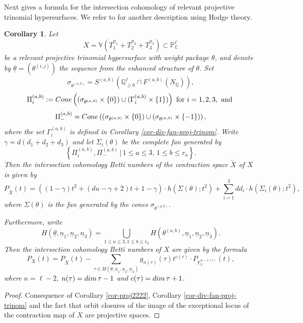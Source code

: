 \documentclass[11pt, reqno]{amsart}
\theoremstyle{plain}
\newtheorem{corollary}[theorem]{Corollary}
\theoremstyle{definition}
\theoremstyle{remark}
\begin{document}
Next gives a formula for the intersection cohomology of relevant projective trinomial hypersurfaces.  We refer 
to \cite{BC94, BB96} for another description using Hodge theory. 
\begin{corollary}
Let 
$$X  =  \mathbb{V}(T_{1}^{\underline{n}_{1}} + T_{2}^{\underline{n}_{2}}  + T_{3}^{\underline{n}_{3}})\subset \mathbb{P}_{\mathbb{C}}^{\ell}$$
be a relevant projective trinomial hypersurface with weight package $\theta$, and denote by $\underline{\theta} =  (\theta^{(i,j)})$ the sequence from the enhanced structure of $\theta$. Set $$\sigma_{\theta^{(a, b)}} =  S^{(a,b)}(\mathbb{Q}_{\geq 0}^{\ell}\cap F^{(a, b)}(N_{\mathbb{Q}})),$$
$$\Pi_{i}^{(a, b)} := {\rm Cone}\left((\sigma_{\theta^{(a, b)}}\times\{0\})\cup (\Gamma_{i}^{(a, b)}\times\{1\})\right)\text{ for }i =1,2,3,
\text{ and }$$
$$\Pi_{-}^{(a, b)}  =  {\rm Cone}\left((\sigma_{\theta^{(a, b)}}\times\{0\})\cup (\sigma_{\theta^{(a, b)}}\times\{-1\})\right),$$
 where the set $\Gamma_{i}^{(a, b)}$ is defined in Corollary \ref{cor-div-fan-proj-trinom}. Write $\gamma =  d(d_{1} + d_{2} + d_{3})$ and let $\Sigma_{i}(\theta)$ be the complete
fan generated by 
$$\left\{\Pi_{i}^{(a, b)}, \Pi_{-}^{(a, b)}\,|\, 1\leq a\leq 3,\, 1\leq b\leq r_{a}\right\}.$$
Then the intersection cohomology Betti numbers of the contraction space $\widetilde{X}$ of $X$ is given by
$$P_{\widetilde{X}}(t) =  \left((1-\gamma)t^{2} + (du - \gamma + 2)t  + 1- \gamma \right)\cdot h(\Sigma(\theta); t^{2}) +  \sum_{i = 1}^{3} dd_{i}\cdot h(\Sigma_{i}(\theta); t^{2}),$$
where $\Sigma(\theta)$ is the fan generated by the cones $\sigma_{\theta^{(a,b)}}$. 

Furthermore, write
$$H(\underline{\theta}, \underline{n}_{1}, \underline{n}_{2}, \underline{n}_{3})  =  \bigcup_{1\leq a \leq 3, 1\leq b \leq r_{a}}
H(\theta^{(a, b)}, \underline{n}_{1}, \underline{n}_{2}, \underline{n}_{3}).$$
Then the intersection cohomology Betti numbers of $X$ are given by the formula 
$$P_{X}(t)  = P_{\widetilde{X}}(t)  -  \sum_{\tau \in H(\underline{\theta}, \underline{n}_{1},\underline{n}_{2},\underline{n}_{3})} g_{n(\tau)}(\tau) t^{c(\tau)} \cdot P_{\mathbb{P}^{n-c(\tau)}_{\mathbb{C}}}(t), $$
where $n =  \ell -2$, $n(\tau) =  {\rm dim}\, \tau - 1$ and $c(\tau) =  {\rm dim}\, \tau +1$.  
\end{corollary}
\begin{proof}
Consequence of Corollary \ref{cor-proj2222}, Corollary \ref{cor-div-fan-proj-trinom} and the fact that orbit closures
of the image of the exceptional locus of the contraction map of $X$ are projective spaces. 
\end{proof}
\end{document}
